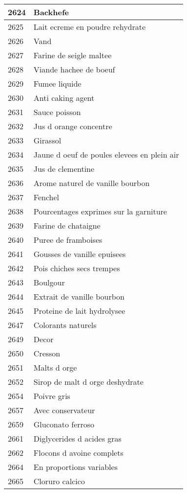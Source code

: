 \begin{longtable}{|l|l|}
2624 & Backhefe \\ \hline 
2625 & Lait ecreme en poudre rehydrate \\ \hline 
2626 & Vand \\ \hline 
2627 & Farine de seigle maltee \\ \hline 
2628 & Viande hachee de boeuf \\ \hline 
2629 & Fumee liquide \\ \hline 
2630 & Anti caking agent \\ \hline 
2631 & Sauce poisson \\ \hline 
2632 & Jus d orange concentre \\ \hline 
2633 & Girassol \\ \hline 
2634 & Jaune d oeuf de poules elevees en plein air \\ \hline 
2635 & Jus de clementine \\ \hline 
2636 & Arome naturel de vanille bourbon \\ \hline 
2637 & Fenchel \\ \hline 
2638 & Pourcentages exprimes sur la garniture \\ \hline 
2639 & Farine de chataigne \\ \hline 
2640 & Puree de framboises \\ \hline 
2641 & Gousses de vanille epuisees \\ \hline 
2642 & Pois chiches secs trempes \\ \hline 
2643 & Boulgour \\ \hline 
2644 & Extrait de vanille bourbon \\ \hline 
2645 & Proteine de lait hydrolysee \\ \hline 
2647 & Colorants naturels \\ \hline 
2649 & Decor \\ \hline 
2650 & Cresson \\ \hline 
2651 & Malts d orge \\ \hline 
2652 & Sirop de malt d orge deshydrate \\ \hline 
2654 & Poivre gris \\ \hline 
2657 & Avec conservateur \\ \hline 
2659 & Gluconato ferroso \\ \hline 
2661 & Diglycerides d acides gras \\ \hline 
2662 & Flocons d avoine complets \\ \hline 
2664 & En proportions variables \\ \hline 
2665 & Cloruro calcico \\ \hline 

\end{longtable}
